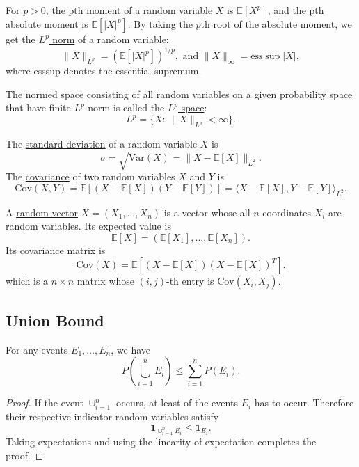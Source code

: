 \begin{definition}[]
\label{def:1.3.3}
For $p > 0$, the \underline{pth moment} of a random variable $X$ is $\mathbb{E}[X^p]$, and the 
\underline{pth absolute moment} is $\mathbb{E}[|X|^p]$. By taking the $p$th root of the absolute moment, 
we get the \underline{$L^p$ norm} of a random variable: 
\[ \lVert X \rVert_{L^p} = (\mathbb{E}[|X|^p])^{1/p}, \text{ and } 
\lVert X \rVert_{\infty} = \text{ess} \sup |X|, \]
where esssup denotes the essential supremum. 

The normed space consisting of all random variables on a given probability space that have finite 
$L^p$ norm is called the \underline{$L^p$ space}:
\[ L^p = \{ X: \ \lVert X \rVert_{L^p} < \infty \}. \]
\end{definition}

\begin{definition}[]
\label{def:1.3.4}
The \underline{standard deviation} of a random variable $X$ is 
\[ \sigma = \sqrt{\mathrm{Var}(X)} = \lVert X - \mathbb{E}[X] \rVert_{L^2}. \]
The \underline{covariance} of two random variables $X$ and $Y$ is 
\[ \mathrm{Cov}(X, Y) = \mathbb{E}[(X - \mathbb{E}[X])(Y - \mathbb{E}[Y])] 
= \langle X - \mathbb{E}[X], Y - \mathbb{E}[Y] \rangle_{L^2}. \]
\end{definition}

\begin{definition}[]
\label{def:1.3.5}
A \underline{random vector} $X = (X_1, \dots, X_n)$ is a vector whose all $n$ coordinates $X_i$ 
are random variables. Its expected value is
\[ \mathbb{E}[X] = (\mathbb{E}[X_1], \dots, \mathbb{E}[X_n]). \]
Its \underline{covariance matrix} is 
\[ \mathrm{Cov}(X) = \mathbb{E}[(X - \mathbb{E}[X]) (X - \mathbb{E}[X])^T]. \]
which is a $n \times n$ matrix whose $(i, j)$-th entry is $\mathrm{Cov}(X_i, X_j)$.
\end{definition}


\subsection{Union Bound}
\begin{lemma}
For any events $E_1, \dots, E_n$, we have 
\[ P \left( \bigcup_{i = 1}^n E_i \right) \leq \sum_{i = 1}^{n} P(E_i). \]
\end{lemma}

\begin{proof}
If the event $\cup_{i = 1}^n$ occurs, at least of the events $E_i$ has to occur. Therefore their respective 
indicator random variables satisfy 
\[ \mathbf{1}_{\cup_{i = 1}^n E_i} \leq \mathbf{1}_{E_i}. \]
Taking expectations and using the linearity of expectation completes the proof.
\end{proof}

